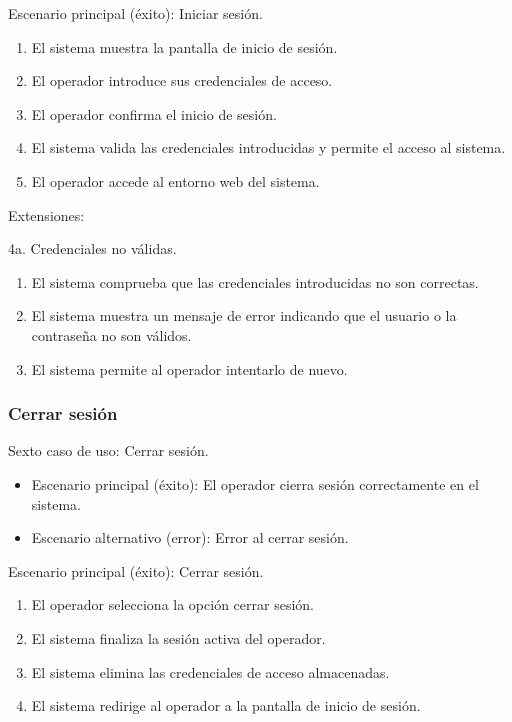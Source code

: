 \documentclass[12pt,a4paper]{report}
\begin{document}
\medskip

\noindent Escenario principal (éxito): Iniciar sesión.

\begin{enumerate}[leftmargin=1.5cm]
    \item El sistema muestra la pantalla de inicio de sesión.
    \item El operador introduce sus credenciales de acceso.
    \item El operador confirma el inicio de sesión.
    \item El sistema valida las credenciales introducidas y permite el acceso al sistema.
    \item El operador accede al entorno web del sistema.
\end{enumerate}

\medskip

\noindent Extensiones:

4a. Credenciales no válidas.
\begin{enumerate}[leftmargin=1.5cm]
    \item El sistema comprueba que las credenciales introducidas no son correctas.
    \item El sistema muestra un mensaje de error indicando que el usuario o la contraseña no son válidos.
    \item El sistema permite al operador intentarlo de nuevo.
\end{enumerate}

\medskip

\subsubsection{Cerrar sesión}

\noindent Sexto caso de uso: Cerrar sesión.

\begin{itemize}[leftmargin=1.5cm]
    \item Escenario principal (éxito): El operador cierra sesión correctamente en el sistema.
    \item Escenario alternativo (error): Error al cerrar sesión.
\end{itemize}

\medskip

\noindent Escenario principal (éxito): Cerrar sesión.

\begin{enumerate}[leftmargin=1.5cm]
    \item El operador selecciona la opción cerrar sesión.
    \item El sistema finaliza la sesión activa del operador.
    \item El sistema elimina las credenciales de acceso almacenadas.
    \item El sistema redirige al operador a la pantalla de inicio de sesión.
\end{enumerate}
\end{document}
